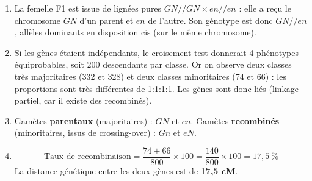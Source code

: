 \documentclass[11pt]{article}
\newcommand{\cle}[1]{{\popxbold\color{popdark}#1}}
\begin{document}
\begin{corrige}
\begin{enumerate}
\item La femelle F1 est issue de lignées pures $GN//GN \times en//en$ : elle a reçu le chromosome $GN$ d'un parent et $en$ de l'autre. Son génotype est donc $GN//en$, allèles dominants en \cle{disposition cis} (sur le même chromosome).
\item Si les gènes étaient indépendants, le croisement-test donnerait 4 phénotypes équiprobables, soit 200 descendants par classe. Or on observe deux classes très majoritaires (332 et 328) et deux classes minoritaires (74 et 66) : les proportions sont très différentes de 1:1:1:1. Les gènes sont donc \cle{liés} (linkage partiel, car il existe des recombinés).
\item Gamètes \textbf{parentaux} (majoritaires) : $GN$ et $en$. Gamètes \textbf{recombinés} (minoritaires, issus de crossing-over) : $Gn$ et $eN$.
\item 
\[ \text{Taux de recombinaison} = \frac{74 + 66}{800} \times 100 = \frac{140}{800} \times 100 = 17{,}5~\% \]
La distance génétique entre les deux gènes est de \textbf{17,5 cM}.
\end{enumerate}
\end{corrige}
\end{document}
